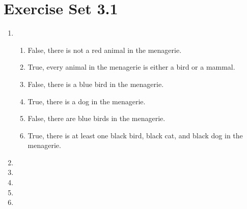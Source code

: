 \documentclass[12pt]{article}
\begin{document}
\section*{Exercise Set 3.1}
\begin{enumerate}
\item %
  \begin{enumerate}
  \item False, there is not a red animal in the menagerie.
  \item True, every animal in the menagerie is either a bird or a mammal.
  \item False, there is a blue bird in the menagerie.
  \item True, there is a dog in the menagerie.
  \item False, there are blue birds in the menagerie.
  \item True, there is at least one black bird, black cat, and black
    dog in the menagerie.
  \end{enumerate}
\setcounter{enumi}{5} %
\item
\setcounter{enumi}{10} %
\item
\item 
\setcounter{enumi}{17} %
\item 
\setcounter{enumi}{32} %
\item 
\end{enumerate}
\end{document}

